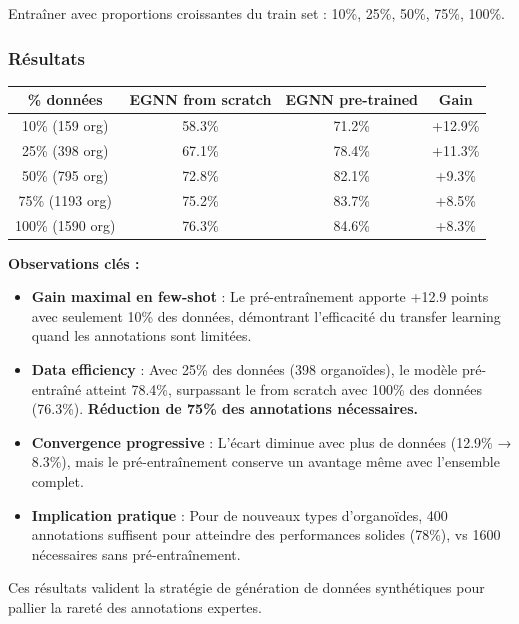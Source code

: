 Entraîner avec proportions croissantes du train set : 10\%, 25\%, 50\%, 75\%, 100\%.

\subsubsection{Résultats}

\begin{center}
\begin{tabular}{|c|c|c|c|}
\hline
\textbf{\% données} & \textbf{EGNN from scratch} & \textbf{EGNN pre-trained} & \textbf{Gain} \\
\hline
10\% (159 org) & 58.3\% & 71.2\% & +12.9\% \\
25\% (398 org) & 67.1\% & 78.4\% & +11.3\% \\
50\% (795 org) & 72.8\% & 82.1\% & +9.3\% \\
75\% (1193 org) & 75.2\% & 83.7\% & +8.5\% \\
100\% (1590 org) & 76.3\% & 84.6\% & +8.3\% \\
\hline
\end{tabular}
\end{center}

\textbf{Observations clés :}
\begin{itemize}
    \item \textbf{Gain maximal en few-shot} : Le pré-entraînement apporte +12.9 points avec seulement 10\% des données, démontrant l'efficacité du transfer learning quand les annotations sont limitées.
    
    \item \textbf{Data efficiency} : Avec 25\% des données (398 organoïdes), le modèle pré-entraîné atteint 78.4\%, surpassant le from scratch avec 100\% des données (76.3\%). \textbf{Réduction de 75\% des annotations nécessaires.}
    
    \item \textbf{Convergence progressive} : L'écart diminue avec plus de données (12.9\% → 8.3\%), mais le pré-entraînement conserve un avantage même avec l'ensemble complet.
    
    \item \textbf{Implication pratique} : Pour de nouveaux types d'organoïdes, 400 annotations suffisent pour atteindre des performances solides (78\%), vs 1600 nécessaires sans pré-entraînement.
\end{itemize}

Ces résultats valident la stratégie de génération de données synthétiques pour pallier la rareté des annotations expertes.

